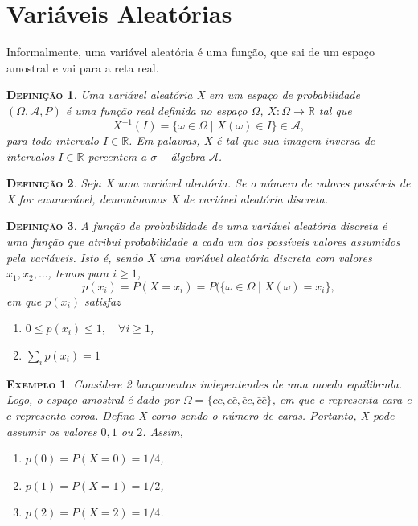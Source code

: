 \documentclass[
	12pt,				%
    oneside,			%
	a4paper,			%
	english,			%
	french,				%
	spanish,			%
	brazil,				%
	]{abntex2}
\newtheorem{definicao}{\scshape Defini\c{c}\~ao}[section]
\newtheorem{ex}{\scshape Exemplo}[section]
\begin{document}
    \section{Variáveis Aleatórias}
        Informalmente, uma variável aleatória é uma função, que sai de um espaço amostral e vai para a reta real.
        \begin{definicao}
            Uma variável aleatória X em um espaço de probabilidade $\left(\Omega, \mathcal{A}, P\right)$ é uma função real definida no espaço $\Omega$, $X: \Omega \to \mathbb{R}$ tal que
            \begin{equation*}
                X^{-1}(I) = \{\omega \in \Omega \mid X(\omega)\in I\} \in \mathcal{A},
            \end{equation*}
            para todo intervalo $I\in\mathbb{R}$. Em palavras, X é tal que sua imagem inversa de intervalos $I\in\mathbb{R}$ percentem a $\sigma-$álgebra $\mathcal{A}$.
        \end{definicao}
        \begin{definicao}
            Seja X uma variável aleatória. Se o número de valores possíveis de X for enumerável, denominamos X de variável aleatória discreta.
        \end{definicao}
        \begin{definicao}
            A função de probabilidade de uma variável aleatória discreta é uma função que atribui probabilidade a cada um dos possíveis valores assumidos pela variáveis. Isto é, sendo X uma variável aleatória discreta com valores $x_1,x_2,\dots$, temos para $i \geq 1$,
            \begin{equation*}
                p(x_i) = P(X=x_i) = P(\{\omega \in \Omega \mid X(\omega) = x_i\},
            \end{equation*}
            em que $p(x_i)$ satisfaz
            \begin{enumerate}
                \item $0 \leq p(x_i) \leq 1, \quad \forall i \geq 1$,
                \item $\sum_{i} p(x_i) = 1$
            \end{enumerate}
        \end{definicao}
        \begin{ex}
            Considere 2 lançamentos indepentendes de uma moeda equilibrada. Logo, o espaço amostral é dado por $\Omega = \{cc,c\bar{c},\bar{c}c,\bar{c}\bar{c}\}$, em que c representa cara e $\bar{c}$ representa coroa. Defina X como sendo o número de caras. Portanto, X pode assumir os valores $0,1$ ou $2$. Assim,
            \begin{enumerate}
                \item $p(0) = P(X=0) = 1/4$,
                \item $p(1) = P(X=1) = 1/2$,
                \item $p(2) = P(X=2) = 1/4$.
            \end{enumerate}
        \end{ex}
\end{document}
